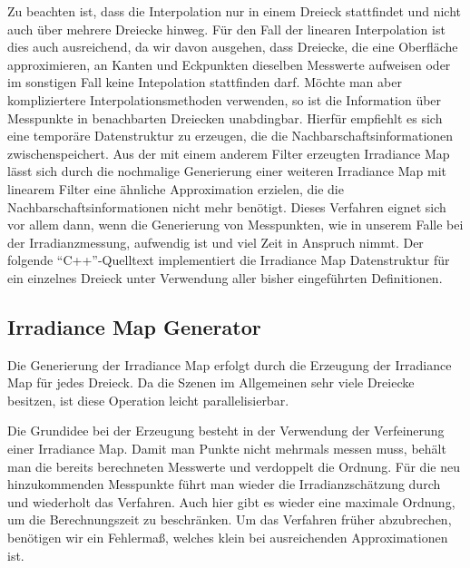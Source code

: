		Zu beachten ist, dass die Interpolation nur in einem Dreieck stattfindet und nicht auch über mehrere Dreiecke hinweg.
		Für den Fall der linearen Interpolation ist dies auch ausreichend, da wir davon ausgehen, dass Dreiecke, die eine Oberfläche approximieren, an Kanten und Eckpunkten dieselben Messwerte aufweisen oder im sonstigen Fall keine Intepolation stattfinden darf.
		Möchte man aber kompliziertere Interpolationsmethoden verwenden, so ist die Information über Messpunkte in benachbarten Dreiecken unabdingbar.
		Hierfür empfiehlt es sich eine temporäre Datenstruktur zu erzeugen, die die Nachbarschaftsinformationen zwischenspeichert.
		Aus der mit einem anderem Filter erzeugten Irradiance Map lässt sich durch die nochmalige Generierung einer weiteren Irradiance Map mit linearem Filter eine ähnliche Approximation erzielen, die die Nachbarschaftsinformationen nicht mehr benötigt.
		Dieses Verfahren eignet sich vor allem dann, wenn die Generierung von Messpunkten, wie in unserem Falle bei der Irradianzmessung, aufwendig ist und viel Zeit in Anspruch nimmt.
		Der folgende \enquote{C++}-Quelltext implementiert die Irradiance Map Datenstruktur für ein einzelnes Dreieck unter Verwendung aller bisher eingeführten Definitionen.
		


	\subsection{Irradiance Map Generator} %
	\label{sub:irradiance_map_generator}

		Die Generierung der Irradiance Map erfolgt durch die Erzeugung der Irradiance Map für jedes Dreieck.
		Da die Szenen im Allgemeinen sehr viele Dreiecke besitzen, ist diese Operation leicht parallelisierbar.

		Die Grundidee bei der Erzeugung besteht in der Verwendung der Verfeinerung einer Irradiance Map.
		Damit man Punkte nicht mehrmals messen muss, behält man die bereits berechneten Messwerte und verdoppelt die Ordnung.
		Für die neu hinzukommenden Messpunkte führt man wieder die Irradianzschätzung durch und wiederholt das Verfahren.
		Auch hier gibt es wieder eine maximale Ordnung, um die Berechnungszeit zu beschränken.
		Um das Verfahren früher abzubrechen, benötigen wir ein Fehlermaß, welches klein bei ausreichenden Approximationen ist.

